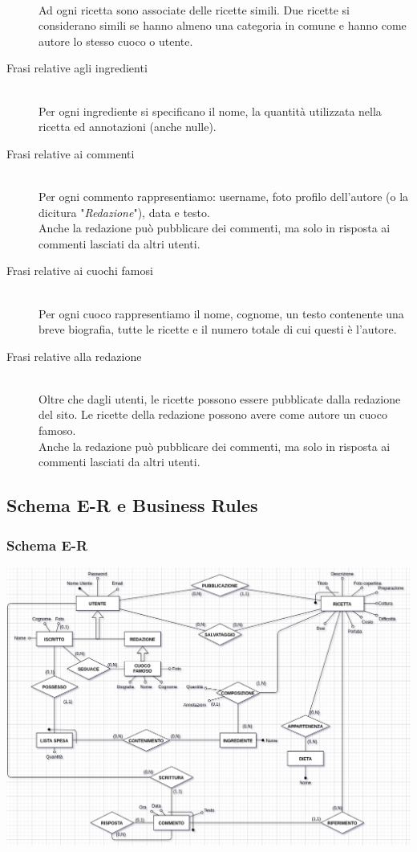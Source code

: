 \documentclass[12pt]{extarticle}
\begin{document}
\begin{description}
    \\ Ad ogni ricetta sono associate delle ricette simili. Due ricette si considerano simili se hanno almeno una categoria in comune e hanno come autore lo stesso cuoco o utente.
    \item[Frasi relative agli ingredienti] \hfill
    \\ Per ogni ingrediente si specificano il nome, la quantità utilizzata nella ricetta ed annotazioni (anche nulle).
    \item[Frasi relative ai commenti] \hfill
    \\ Per ogni commento rappresentiamo: username, foto profilo dell'autore (o la dicitura "\textit{Redazione}"), data e testo.
    \\ Anche la redazione può pubblicare dei commenti, ma solo in risposta ai commenti lasciati da altri utenti.    
    \item[Frasi relative ai cuochi famosi] \hfill
    \\ Per ogni cuoco rappresentiamo il nome, cognome, un testo contenente una breve biografia, tutte le ricette e il numero totale di cui questi è l'autore.
    \item[Frasi relative alla redazione] \hfill  
    \\ Oltre che dagli utenti, le ricette possono essere pubblicate dalla redazione del sito. Le ricette della redazione possono avere come autore un cuoco famoso.
    \\ Anche la redazione può pubblicare dei commenti, ma solo in risposta ai commenti lasciati da altri utenti.    
\end{description}

\newpage

\subsection{Schema E-R e Business Rules}
\subsubsection{Schema E-R}

\includegraphics[width=\textwidth]{er1.png}
\end{document}
